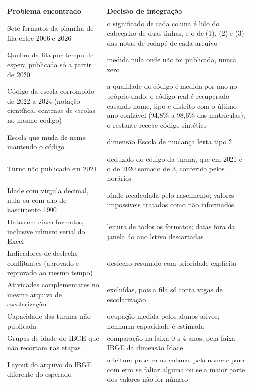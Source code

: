 \documentclass[11pt,a4paper]{article}
\begin{document}
\begin{longtable}{>{\raggedright}p{5.2cm}>{\raggedright\arraybackslash}p{9.6cm}}
\toprule\textbf{Problema encontrado} & \textbf{Decisão de integração}\\\midrule\endhead
\bottomrule\endlastfoot
Sete formatos da planilha de fila entre 2006 e 2026 & o significado de cada coluna é lido do cabeçalho de duas linhas, e o de (1), (2) e (3) das notas de rodapé de cada arquivo \\
Quebra da fila por tempo de espera publicada só a partir de 2020 & medida nula onde não foi publicada, nunca zero \\
Código da escola corrompido de 2022 a 2024 (notação científica, centenas de escolas no mesmo código) & a qualidade do código é medida por ano no próprio dado; o código real é recuperado casando nome, tipo e distrito com o último ano confiável (94,8\% a 98,6\% das matrículas); o restante recebe código sintético \\
Escola que muda de nome mantendo o código & dimensão Escola de mudança lenta tipo 2 \\
Turno não publicado em 2021 & deduzido do código da turma, que em 2021 é o de 2020 somado de 3, conferido pelos horários \\
Idade com vírgula decimal, nula ou com ano de nascimento 1900 & idade recalculada pelo nascimento; valores impossíveis tratados como não informados \\
Datas em cinco formatos, inclusive número serial do Excel & leitura de todos os formatos; datas fora da janela do ano letivo descartadas \\
Indicadores de desfecho conflitantes (aprovado e reprovado ao mesmo tempo) & desfecho resumido com prioridade explícita \\
Atividades complementares no mesmo arquivo de escolarização & excluídas, pois a fila só conta vagas de escolarização \\
Capacidade das turmas não publicada & ocupação medida pelos alunos ativos; nenhuma capacidade é estimada \\
Grupos de idade do IBGE que não recortam nas etapas & comparação na faixa 0 a 4 anos, pela faixa IBGE da dimensão Idade \\
Layout do arquivo do IBGE diferente do esperado & a leitura procura as colunas pelo nome e para com erro se faltar alguma ou se a maior parte dos valores não for número \\
\end{longtable}
\addtocounter{table}{-1}
\end{document}

